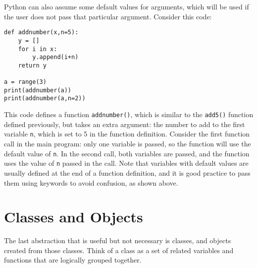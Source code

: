 \documentclass[12pt]{article}
\newcommand{\code}{\texttt}
\begin{document}
Python can also assume some default values for arguments, which will be used if the user does not pass that particular argument. Consider this code:

\begin{lstlisting}[frame=single] 
def addnumber(x,n=5):
    y = []
    for i in x:
        y.append(i+n)
    return y

a = range(3)
print(addnumber(a))
print(addnumber(a,n=2))
\end{lstlisting}

This code defines a function \code{addnumber()}, which is similar to the \code{add5()} function defined previously, but takes an extra argument: the number to add to the first variable \code{n}, which is set to 5 in the function definition. Consider the first function call in the main program: only one variable is passed, so the function will use the default value of \code{n}. In the second call, both variables are passed, and the function uses the value of \code{n} passed in the call. Note that variables with default values are usually defined at the end of a function definition, and it is good practice to pass them using keywords to avoid confusion, as shown above.

\newpage
\section{Classes and Objects}
The last abstraction that is useful but not necessary is classes, and objects created from those classes. Think of a class as a set of related variables and functions that are logically grouped together. 
\end{document}
